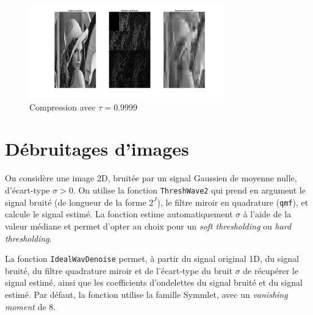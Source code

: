 \documentclass[a4paper,12pt, openany, twoside]{article}
\theoremstyle{break}
\begin{document}
\begin{figure}[H]
  \centering
  \includegraphics[width=0.75\textwidth]{comp_lenna2}\vfill
  \caption{Compression avec $\tau=0.9999$}
\end{figure}


\section{Débruitages d'images}
On considère une image 2D, bruitée par un signal Gaussien de moyenne nulle, d'écart-type $\sigma > 0$. On utilise la fonction \texttt{ThreshWave2} qui prend en argument le signal bruité (de longueur de la forme $2^J$), le filtre miroir en quadrature (\texttt{qmf}), et calcule le signal estimé. La fonction estime automatiquement $\sigma$ à l'aide de la valeur médiane et permet d'opter au choix pour un \textit{soft thresholding} ou \textit{hard thresholding}.

La fonction \texttt{IdealWavDenoise} permet, à partir du signal original 1D, du signal bruité, du filtre quadrature miroir et de l'écart-type du bruit $\sigma$ de récupérer le signal estimé, ainsi que les coefficients d'ondelettes du signal bruité et du signal estimé. Par défaut, la fonction utilise la famille Symmlet, avec un \textit{vanishing moment} de 8.
\end{document}
